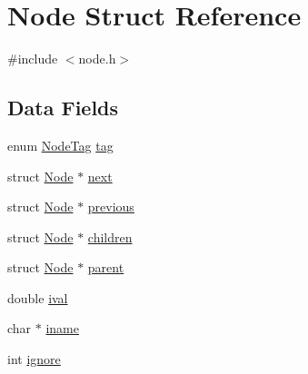 \hypertarget{struct_node}{\section{Node Struct Reference}
\label{struct_node}
}


{\ttfamily \#include $<$node.\-h$>$}

\subsection*{Data Fields}
\begin{DoxyCompactItemize}
\item 
enum \hyperlink{node_8h_a83ba1e84fa23f6619c3d29036b160919}{Node\-Tag} \hyperlink{struct_node_aae55c9a8e76121d7f9c721c0239e6fb8}{tag}
\item 
struct \hyperlink{struct_node}{Node} $\ast$ \hyperlink{struct_node_aa162dd1e0693188a22b1f13b9a2a0ef0}{next}
\item 
struct \hyperlink{struct_node}{Node} $\ast$ \hyperlink{struct_node_a9a9311efc5dc64017bf492a386b77b0d}{previous}
\item 
struct \hyperlink{struct_node}{Node} $\ast$ \hyperlink{struct_node_a827ac726d02ddf6d00ba8a55cd296df2}{children}
\item 
struct \hyperlink{struct_node}{Node} $\ast$ \hyperlink{struct_node_a7b739036012f282683e6452a0b1595af}{parent}
\item 
double \hyperlink{struct_node_ad7f9455e819b623c0e4a9480476eacfe}{ival}
\item 
char $\ast$ \hyperlink{struct_node_a76c70ae7ac3d58ebe41da968fedb8093}{iname}
\item 
int \hyperlink{struct_node_a28a2a20ee60bdfbd168e4f4bf20d8c82}{ignore}
\end{DoxyCompactItemize}


